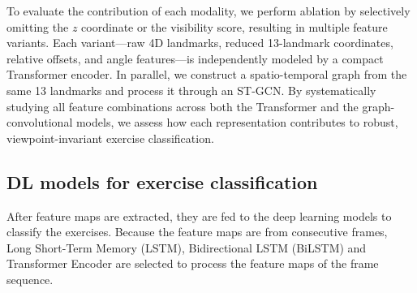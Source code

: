 \documentclass[runningheads]{llncs}
\begin{document}
To evaluate the contribution of each modality, we perform ablation by selectively omitting the $z$ coordinate or the visibility score, resulting in multiple feature variants. 
Each variant—raw 4D landmarks, reduced 13-landmark coordinates, relative offsets, and angle features—is independently modeled by a compact Transformer encoder. 
In parallel, we construct a spatio-temporal graph from the same 13 landmarks and process it through an ST-GCN. 
By systematically studying all feature combinations across both the Transformer and the graph-convolutional models, we assess how each representation contributes to robust, viewpoint-invariant exercise classification.

\subsection{DL models for exercise classification}

After feature maps are extracted, they are fed to the deep learning models to classify the exercises.
Because the feature maps are from consecutive frames, Long Short-Term Memory (LSTM), Bidirectional LSTM (BiLSTM) and Transformer Encoder are selected to process the feature maps of the frame sequence.
\end{document}
